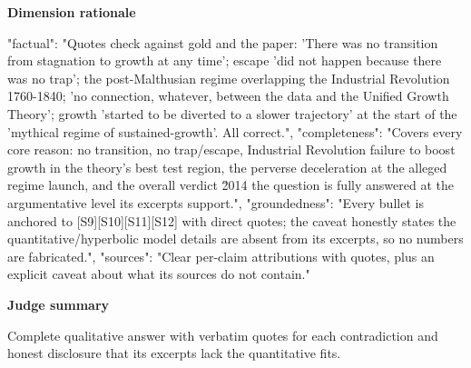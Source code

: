 \documentclass[10pt]{article}
\begin{document}
\textbf{Dimension rationale}
\begin{EvidenceText}
{
  "factual": "Quotes check against gold and the paper: 'There was no transition from stagnation to growth at any time'; escape 'did not happen because there was no trap'; the post-Malthusian regime overlapping the Industrial Revolution 1760-1840; 'no connection, whatever, between the data and the Unified Growth Theory'; growth 'started to be diverted to a slower trajectory' at the start of the 'mythical regime of sustained-growth'. All correct.",
  "completeness": "Covers every core reason: no transition, no trap/escape, Industrial Revolution failure to boost growth in the theory's best test region, the perverse deceleration at the alleged regime launch, and the overall verdict \u2014 the question is fully answered at the argumentative level its excerpts support.",
  "groundedness": "Every bullet is anchored to [S9][S10][S11][S12] with direct quotes; the caveat honestly states the quantitative/hyperbolic model details are absent from its excerpts, so no numbers are fabricated.",
  "sources": "Clear per-claim attributions with quotes, plus an explicit caveat about what its sources do not contain."
}
\end{EvidenceText}

\textbf{Judge summary}
\begin{EvidenceText}
Complete qualitative answer with verbatim quotes for each contradiction and honest disclosure that its excerpts lack the quantitative fits.
\end{EvidenceText}
\end{document}
